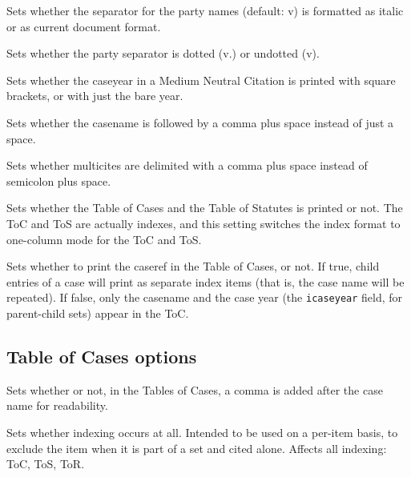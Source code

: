 
Sets whether the separator for the party names (default: v) is formatted as italic or as current document format.
\bigskip


Sets whether the party separator is dotted (v.) or undotted (v).
\bigskip


Sets whether the caseyear in a Medium Neutral Citation is printed with square brackets, or with just the bare year.
\bigskip


Sets whether the casename is followed by a comma plus space instead of just a space.
\bigskip


Sets whether multicites are delimited with a comma plus space instead of semicolon plus space.
\bigskip



Sets whether the Table of Cases and the Table of Statutes is printed or not. The ToC and ToS are actually indexes, and this setting switches the index format to one-column mode for the ToC and ToS.
\bigskip


Sets whether to print the caseref in the Table of Cases, or not. If true, child entries of a case will print as separate index items (that is, the case name will be repeated). If false, only the casename and the case year (the \texttt{icaseyear} field, for parent-child sets) appear in the ToC.
\bigskip


\subsection{Table of Cases options}


Sets whether or not, in the Tables of Cases, a comma is added after the case name for readability.
\bigskip


Sets whether indexing occurs at all. Intended to be used on a per-item basis, to exclude the item when it is part of a set and cited alone. Affects all indexing: ToC, ToS, ToR.
\bigskip


